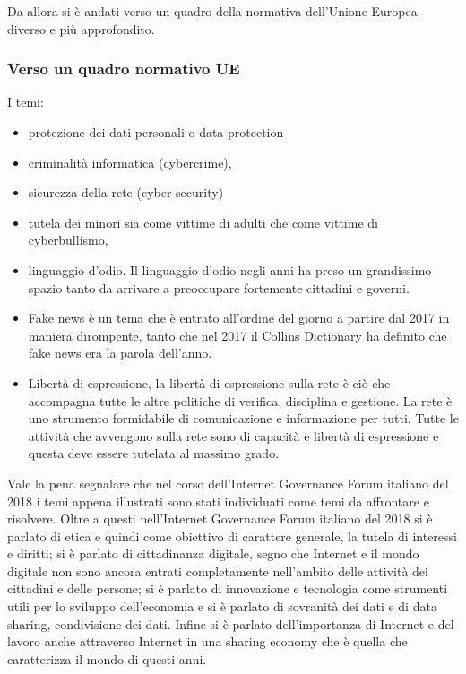 Da allora si è andati verso un quadro della normativa dell'Unione Europea diverso e più approfondito.

\subsubsection{Verso un quadro normativo UE }
I temi:

\begin{itemize}
    \item protezione dei dati personali o data protection
    \item criminalità informatica (cybercrime),
    \item sicurezza della rete (cyber security)
    \item tutela dei minori sia come vittime di adulti che come vittime di cyberbullismo,
    \item linguaggio d'odio. Il linguaggio d'odio negli anni ha preso un grandissimo spazio tanto da arrivare a preoccupare fortemente cittadini e governi.
    \item Fake news è un tema che è entrato all'ordine del giorno a partire dal 2017 in maniera dirompente, tanto che nel 2017 il Collins Dictionary ha definito che fake news era la parola dell'anno.
    \item Libertà di espressione, la libertà di espressione sulla rete è ciò che accompagna tutte le altre politiche di verifica, disciplina e gestione. La rete è uno strumento formidabile di comunicazione e informazione per tutti. Tutte le attività che avvengono sulla rete sono di capacità e libertà di espressione e questa deve essere tutelata al massimo grado.
\end{itemize}

Vale la pena segnalare che nel corso dell'Internet Governance Forum italiano del 2018 i temi appena illustrati sono stati individuati come temi da affrontare e risolvere. Oltre a questi nell'Internet Governance Forum italiano del 2018 si è parlato di etica e quindi come obiettivo di carattere generale, la tutela di interessi e diritti; si è parlato di cittadinanza digitale, segno che Internet e il mondo digitale non sono ancora entrati completamente nell'ambito delle attività dei cittadini e delle persone; si è parlato di innovazione e tecnologia come strumenti utili per lo sviluppo dell'economia e si è parlato di sovranità dei dati e di data sharing, condivisione dei dati. Infine si è parlato dell'importanza di Internet e del lavoro anche attraverso Internet in una sharing economy che è quella che caratterizza il mondo di questi anni.

